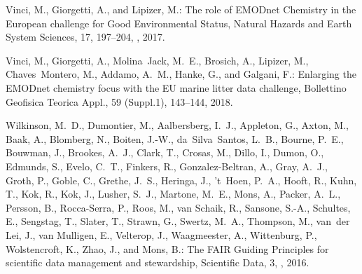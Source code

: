 \documentclass[essd, manuscript]{copernicus}
\begin{document}
\begin{thebibliography}{52}
Vinci, M., Giorgetti, A., and Lipizer, M.: {The role of EMODnet Chemistry in
  the European challenge for Good Environmental Status}, Natural Hazards and
  Earth System Sciences, 17, 197–204, , 2017.

Vinci, M., Giorgetti, A., Molina~Jack, M.~E., Brosich, A., Lipizer, M.,
  Chaves~Montero, M., Addamo, A.~M., Hanke, G., and Galgani, F.: {Enlarging the
  EMODnet chemistry focus with the EU marine litter data challenge}, Bollettino
  Geofisica Teorica Appl., 59 (Suppl.1), 143--144, 2018.

Wilkinson, M.~D., Dumontier, M., Aalbersberg, I.~J., Appleton, G., Axton, M.,
  Baak, A., Blomberg, N., Boiten, J.-W., da~Silva~Santos, L.~B., Bourne, P.~E.,
  Bouwman, J., Brookes, A.~J., Clark, T., Crosas, M., Dillo, I., Dumon, O.,
  Edmunds, S., Evelo, C.~T., Finkers, R., Gonzalez-Beltran, A., Gray, A.~J.,
  Groth, P., Goble, C., Grethe, J.~S., Heringa, J., 't~Hoen, P.~A., Hooft, R.,
  Kuhn, T., Kok, R., Kok, J., Lusher, S.~J., Martone, M.~E., Mons, A., Packer,
  A.~L., Persson, B., Rocca-Serra, P., Roos, M., van Schaik, R., Sansone,
  S.-A., Schultes, E., Sengstag, T., Slater, T., Strawn, G., Swertz, M.~A.,
  Thompson, M., van~der Lei, J., van Mulligen, E., Velterop, J., Waagmeester,
  A., Wittenburg, P., Wolstencroft, K., Zhao, J., and Mons, B.: The FAIR
  Guiding Principles for scientific data management and stewardship, Scientific
  Data, 3, , 2016.


\end{thebibliography}
\end{document}

